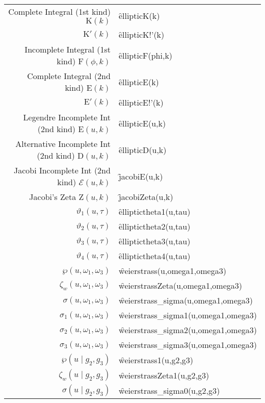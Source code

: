 {\begin{tabular}{r l}
Complete Integral (1st kind) $\mathrm{K}(k)$ & \f{ellipticK(k)}\\
$\mathrm{K}'(k)$ & \f{ellipticK!'(k)}\\
Incomplete Integral (1st kind) $\mathrm{F}(\phi,k)$ & \f{ellipticF(phi,k)}\\
Complete Integral (2nd kind) $\mathrm{E}(k)$ & \f{ellipticE(k)}\\
$\mathrm{E}'(k)$ & \f{ellipticE!'(k)}\\
Legendre Incomplete Int (2nd kind) $\mathrm{E}(u,k)$ & \f{ellipticE(u,k)}\\
Alternative Incomplete Int (2nd kind) $\mathrm{D}(u,k)$ & \f{ellipticD(u,k)}\\
Jacobi Incomplete Int (2nd kind) $\mathcal{E}(u,k)$ & \f{jacobiE(u,k)}\\
Jacobi's Zeta $\mathrm{Z}(u,k)$ & \f{jacobiZeta(u,k)}\\
$\vartheta_1(u,\tau)$ & \f{elliptictheta1(u,tau)}\\
$\vartheta_2(u,\tau)$ & \f{elliptictheta2(u,tau)}\\
$\vartheta_3(u,\tau)$ & \f{elliptictheta3(u,tau)}\\
$\vartheta_4(u,\tau)$ & \f{elliptictheta4(u,tau)}\\
$\wp(u,\omega_1, \omega_3)$ & \f{weierstrass(u,omega1,omega3)}\\
$\zeta_w(u,\omega_1, \omega_3)$ & \f{weierstrassZeta(u,omega1,omega3)}\\
$\sigma(u,\omega_1, \omega_3)$ & \f{weierstrass\_sigma(u,omega1,omega3)}\\
$\sigma_1(u,\omega_1, \omega_3)$ & \f{weierstrass\_sigma1(u,omega1,omega3)}\\
$\sigma_2(u,\omega_1, \omega_3)$ & \f{weierstrass\_sigma2(u,omega1,omega3)}\\
$\sigma_3(u,\omega_1, \omega_3)$ & \f{weierstrass\_sigma3(u,omega1,omega3)}\\
$\wp(u \mid g_2, g_3)$ & \f{weierstrass1(u,g2,g3)}\\
$\zeta_w(u \mid g_2, g_3)$ & \f{weierstrassZeta1(u,g2,g3)}\\
$\sigma(u \mid g_2, g_3)$ & \f{weierstrass\_sigma0(u,g2,g3)}\\[5pt]
\end{tabular}}
